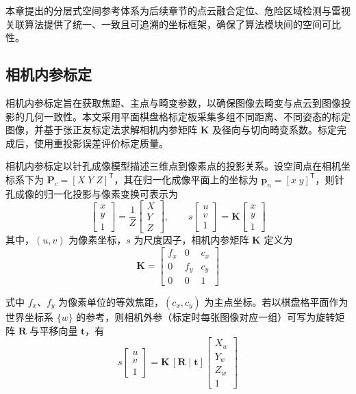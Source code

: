 本章提出的分层式空间参考体系为后续章节的点云融合定位、危险区域检测与雷视关联算法提供了统一、一致且可追溯的坐标框架，确保了算法模块间的空间可比性。

\subsection{相机内参标定}\label{ux76f8ux673aux5185ux53c2ux6807ux5b9a}

相机内参标定旨在获取焦距、主点与畸变参数，以确保图像去畸变与点云到图像投影的几何一致性。本文采用平面棋盘格标定板采集多组不同距离、不同姿态的标定图像，并基于张正友标定法求解相机内参矩阵 $\mathbf{K}$ 及径向与切向畸变系数。标定完成后，使用重投影误差评价标定质量。

相机内参标定以针孔成像模型描述三维点到像素点的投影关系。设空间点在相机坐标系下为 $\mathbf{P}_c=[X\;Y\;Z]^{\mathsf{T}}$，其在归一化成像平面上的坐标为 $\mathbf{p}_n=[x\;y]^{\mathsf{T}}$，则针孔成像的归一化投影与像素变换可表示为
\begin{equation}
\label{eq:camera_projection}
\begin{bmatrix}
x \\
y \\
1
\end{bmatrix}
= \frac{1}{Z}
\begin{bmatrix}
X \\
Y \\
Z
\end{bmatrix},\qquad
s\begin{bmatrix}
u \\
v \\
1
\end{bmatrix}
= \mathbf{K}
\begin{bmatrix}
x \\
y \\
1
\end{bmatrix}
\end{equation}
其中，$(u,v)$ 为像素坐标，$s$ 为尺度因子，相机内参矩阵 $\mathbf{K}$ 定义为
\begin{equation}
\label{eq:intrinsic_matrix}
\mathbf{K}=
\begin{bmatrix}
f_x & 0 & c_x \\
0 & f_y & c_y \\
0 & 0 & 1
\end{bmatrix}
\end{equation}

式中 $f_x$、$f_y$ 为像素单位的等效焦距，$(c_x,c_y)$ 为主点坐标。若以棋盘格平面作为世界坐标系 $\{w\}$ 的参考，则相机外参（标定时每张图像对应一组）可写为旋转矩阵 $\mathbf{R}$ 与平移向量 $\mathbf{t}$，有
\begin{equation}
\label{eq:extrinsic_matrix}
s\begin{bmatrix}
u \\
v \\
1
\end{bmatrix}
=\mathbf{K}\,[\mathbf{R}\;|\;\mathbf{t}]\begin{bmatrix}
X_w \\
Y_w \\
Z_w \\
1
\end{bmatrix}
\end{equation}

